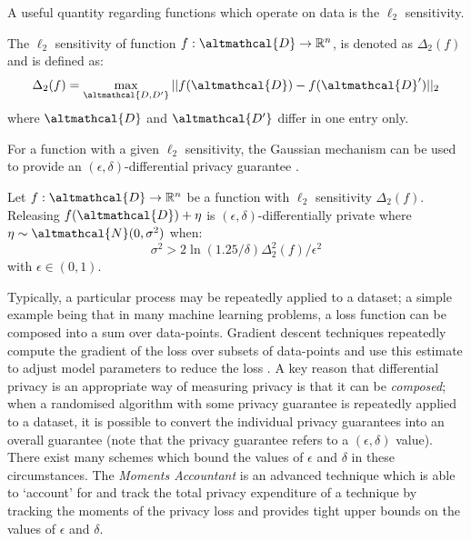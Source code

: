 A useful quantity regarding functions which operate on data is the $\ell_2$ sensitivity. 
\begin{definition}
	The $\ell_2$ sensitivity of function $f: \altmathcal{D} \rightarrow \mathbb{R}^n$, is denoted as $\Delta_2(f)$ and is defined as:
	\begin{align}
		\Delta_2(f) = \max_{\altmathcal{D, D'}} || f(\altmathcal{D}) - f(\altmathcal{D}')||_2
	\end{align}
	where $\altmathcal{D}$ and $\altmathcal{D'}$ differ in one entry only. 
\end{definition}
For a function with a given $\ell_2$ sensitivity, the Gaussian mechanism can be used to provide an $(\epsilon, \delta)$-differential privacy guarantee \citep{foundations}. 
\begin{theorem}
	Let $f: \altmathcal{D} \rightarrow \mathbb{R}^n$ be a function with $\ell_2$ sensitivity $\Delta_2(f)$. Releasing $f(\altmathcal{D}) + \eta$ is $(\epsilon, \delta)$-differentially private where $\eta \sim \altmathcal{N}(0, \sigma^2)$ when:
	\begin{equation}
	\sigma^2 > 2 \ln (1.25/ \delta) \Delta_2^2(f)/\epsilon^2
	\label{eq:litreview-GaussianMech}
	\end{equation}
	with $\epsilon \in (0,1)$.
\end{theorem}

Typically, a particular process may be repeatedly applied to a dataset; a simple example being that in many machine learning problems, a loss function can be composed into a sum over data-points. Gradient descent techniques repeatedly compute the gradient of the loss over subsets of data-points and use this estimate to adjust model parameters to reduce the loss \citep{ruder2016overview}. A key reason that differential privacy is an appropriate way of measuring privacy is that it can be \emph{composed}; when a randomised algorithm with some privacy guarantee is repeatedly applied to a dataset, it is possible to convert the individual privacy guarantees into an overall guarantee (note that the privacy guarantee refers to a $(\epsilon, \delta)$ value). There exist many schemes which bound the values of $\epsilon$ and $\delta$ in these circumstances. The \emph{Moments Accountant} is an advanced technique which is able to `account' for and track the total privacy expenditure of a technique by tracking the moments of the privacy loss and provides tight upper bounds on the values of $\epsilon$ and $\delta$. 

